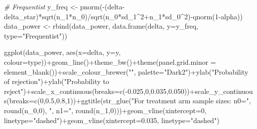 \documentclass[
]{book}
\newenvironment{Shaded}{\begin{snugshade}}{\end{snugshade}}
\newcommand{\AttributeTok}[1]{\textcolor[rgb]{0.77,0.63,0.00}{#1}}
\newcommand{\CommentTok}[1]{\textcolor[rgb]{0.56,0.35,0.01}{\textit{#1}}}
\newcommand{\DecValTok}[1]{\textcolor[rgb]{0.00,0.00,0.81}{#1}}
\newcommand{\FloatTok}[1]{\textcolor[rgb]{0.00,0.00,0.81}{#1}}
\newcommand{\FunctionTok}[1]{\textcolor[rgb]{0.00,0.00,0.00}{#1}}
\newcommand{\NormalTok}[1]{#1}
\newcommand{\OtherTok}[1]{\textcolor[rgb]{0.56,0.35,0.01}{#1}}
\newcommand{\SpecialCharTok}[1]{\textcolor[rgb]{0.00,0.00,0.00}{#1}}
\newcommand{\StringTok}[1]{\textcolor[rgb]{0.31,0.60,0.02}{#1}}
\begin{document}
\begin{Shaded}
\begin{Highlighting}[]
\CommentTok{\# Frequentist}
\NormalTok{y\_freq }\OtherTok{\textless{}{-}} \FunctionTok{pnorm}\NormalTok{(}\SpecialCharTok{{-}}\NormalTok{(delta}\SpecialCharTok{{-}}\NormalTok{delta\_star)}\SpecialCharTok{*}\FunctionTok{sqrt}\NormalTok{(n\_1}\SpecialCharTok{*}\NormalTok{n\_0)}\SpecialCharTok{/}\FunctionTok{sqrt}\NormalTok{(n\_0}\SpecialCharTok{*}\NormalTok{sd\_1}\SpecialCharTok{\^{}}\DecValTok{2}\SpecialCharTok{+}\NormalTok{n\_1}\SpecialCharTok{*}\NormalTok{sd\_0}\SpecialCharTok{\^{}}\DecValTok{2}\NormalTok{)}\SpecialCharTok{{-}}\FunctionTok{qnorm}\NormalTok{(}\DecValTok{1}\SpecialCharTok{{-}}\NormalTok{alpha))}
\NormalTok{data\_power }\OtherTok{\textless{}{-}} \FunctionTok{rbind}\NormalTok{(data\_power, }\FunctionTok{data.frame}\NormalTok{(delta, }\AttributeTok{y=}\NormalTok{y\_freq, }\AttributeTok{type=}\StringTok{"Frequentist"}\NormalTok{))}

\FunctionTok{ggplot}\NormalTok{(data\_power, }\FunctionTok{aes}\NormalTok{(}\AttributeTok{x=}\NormalTok{delta, }\AttributeTok{y=}\NormalTok{y, }\AttributeTok{colour=}\NormalTok{type))}\SpecialCharTok{+}\FunctionTok{geom\_line}\NormalTok{()}\SpecialCharTok{+}\FunctionTok{theme\_bw}\NormalTok{()}\SpecialCharTok{+}\FunctionTok{theme}\NormalTok{(}\AttributeTok{panel.grid.minor =} \FunctionTok{element\_blank}\NormalTok{())}\SpecialCharTok{+}\FunctionTok{scale\_colour\_brewer}\NormalTok{(}\StringTok{""}\NormalTok{, }\AttributeTok{palette=}\StringTok{"Dark2"}\NormalTok{)}\SpecialCharTok{+}\FunctionTok{ylab}\NormalTok{(}\StringTok{"Probability of rejection"}\NormalTok{)}\SpecialCharTok{+}\FunctionTok{ylab}\NormalTok{(}\StringTok{"Probability to reject"}\NormalTok{)}\SpecialCharTok{+}\FunctionTok{scale\_x\_continuous}\NormalTok{(}\AttributeTok{breaks=}\FunctionTok{c}\NormalTok{(}\SpecialCharTok{{-}}\FloatTok{0.025}\NormalTok{,}\DecValTok{0}\NormalTok{,}\FloatTok{0.035}\NormalTok{,}\FloatTok{0.050}\NormalTok{))}\SpecialCharTok{+}\FunctionTok{scale\_y\_continuous}\NormalTok{(}\AttributeTok{breaks=}\FunctionTok{c}\NormalTok{(}\DecValTok{0}\NormalTok{,}\FloatTok{0.5}\NormalTok{,}\FloatTok{0.8}\NormalTok{,}\DecValTok{1}\NormalTok{))}\SpecialCharTok{+}\FunctionTok{ggtitle}\NormalTok{(}\FunctionTok{str\_glue}\NormalTok{(}\StringTok{"For treatment arm sample sizes: n0="}\NormalTok{, }\FunctionTok{round}\NormalTok{(n\_0,}\DecValTok{0}\NormalTok{), }\StringTok{", n1="}\NormalTok{, }\FunctionTok{round}\NormalTok{(n\_1,}\DecValTok{0}\NormalTok{)))}\SpecialCharTok{+}\FunctionTok{geom\_vline}\NormalTok{(}\AttributeTok{xintercept=}\DecValTok{0}\NormalTok{, }\AttributeTok{linetype=}\StringTok{"dashed"}\NormalTok{)}\SpecialCharTok{+}\FunctionTok{geom\_vline}\NormalTok{(}\AttributeTok{xintercept=}\FloatTok{0.035}\NormalTok{, }\AttributeTok{linetype=}\StringTok{"dashed"}\NormalTok{)}
\end{Highlighting}
\end{Shaded}
\end{document}
